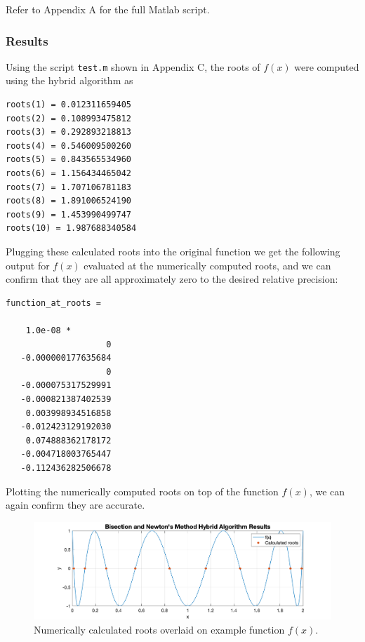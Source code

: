 \documentclass[10pt]{article}
\def\code#1{\texttt{#1}}
\begin{document}
Refer to Appendix A for the full Matlab script.

\subsubsection*{Results}

Using the script \code{test.m} shown in Appendix C, the roots of $f(x)$ were computed using the hybrid algorithm
as 
\begin{verbatim}
roots(1) = 0.012311659405
roots(2) = 0.108993475812
roots(3) = 0.292893218813
roots(4) = 0.546009500260
roots(5) = 0.843565534960
roots(6) = 1.156434465042
roots(7) = 1.707106781183
roots(8) = 1.891006524190
roots(9) = 1.453990499747
roots(10) = 1.987688340584
\end{verbatim}

Plugging these calculated roots into the original function we get the following output for $f(x)$ evaluated at the 
numerically computed roots, and we can confirm that they are all approximately zero to the desired relative 
precision:

\begin{verbatim}
function_at_roots =

    1.0e-08 *
                    0
   -0.000000177635684
                    0
   -0.000075317529991
   -0.000821387402539
    0.003998934516858
   -0.012423129192030
    0.074888362178172
   -0.004718003765447
   -0.112436282506678
\end{verbatim}

Plotting the numerically computed roots on top of the function $f(x)$, we can again confirm they are accurate.

\begin{figure}[h!]
\centering
\includegraphics[width=1\textwidth]{HybridPlot.png}
\caption{Numerically calculated roots overlaid on example function $f(x)$.}
\end{figure}

\pagebreak

\end{document}
